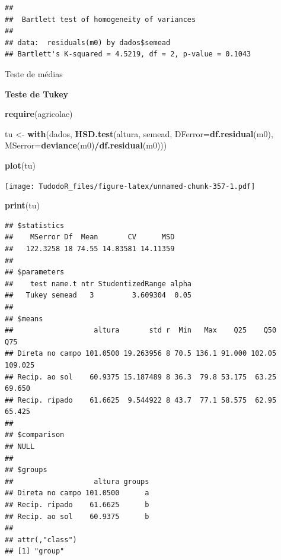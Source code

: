 \documentclass[
]{book}
\newenvironment{Shaded}{\begin{snugshade}}{\end{snugshade}}
\newcommand{\DataTypeTok}[1]{\textcolor[rgb]{0.13,0.29,0.53}{#1}}
\newcommand{\KeywordTok}[1]{\textcolor[rgb]{0.13,0.29,0.53}{\textbf{#1}}}
\newcommand{\NormalTok}[1]{#1}
\newcommand{\OperatorTok}[1]{\textcolor[rgb]{0.81,0.36,0.00}{\textbf{#1}}}
\newcommand{\StringTok}[1]{\textcolor[rgb]{0.31,0.60,0.02}{#1}}
\begin{document}
\begin{verbatim}
## 
##  Bartlett test of homogeneity of variances
## 
## data:  residuals(m0) by dados$semead
## Bartlett's K-squared = 4.5219, df = 2, p-value = 0.1043
\end{verbatim}

Teste de médias

\textbf{Teste de Tukey}

\begin{Shaded}
\begin{Highlighting}[]
\KeywordTok{require}\NormalTok{(agricolae)}
\end{Highlighting}
\end{Shaded}

\begin{Shaded}
\begin{Highlighting}[]
\NormalTok{tu <-}\StringTok{ }\KeywordTok{with}\NormalTok{(dados, }\KeywordTok{HSD.test}\NormalTok{(altura, semead,}
\DataTypeTok{DFerror=}\KeywordTok{df.residual}\NormalTok{(m0),}
\DataTypeTok{MSerror=}\KeywordTok{deviance}\NormalTok{(m0)}\OperatorTok{/}\KeywordTok{df.residual}\NormalTok{(m0)))}
\end{Highlighting}
\end{Shaded}

\begin{Shaded}
\begin{Highlighting}[]
\KeywordTok{plot}\NormalTok{(tu)}
\end{Highlighting}
\end{Shaded}

\texttt{[image: TudodoR\_files/figure-latex/unnamed-chunk-357-1.pdf]}

\begin{Shaded}
\begin{Highlighting}[]
\KeywordTok{print}\NormalTok{(tu)}
\end{Highlighting}
\end{Shaded}

\begin{verbatim}
## $statistics
##    MSerror Df  Mean       CV      MSD
##   122.3258 18 74.55 14.83581 14.11359
## 
## $parameters
##    test name.t ntr StudentizedRange alpha
##   Tukey semead   3         3.609304  0.05
## 
## $means
##                   altura       std r  Min   Max    Q25    Q50     Q75
## Direta no campo 101.0500 19.263956 8 70.5 136.1 91.000 102.05 109.025
## Recip. ao sol    60.9375 15.187489 8 36.3  79.8 53.175  63.25  69.650
## Recip. ripado    61.6625  9.544922 8 43.7  77.1 58.575  62.95  65.425
## 
## $comparison
## NULL
## 
## $groups
##                   altura groups
## Direta no campo 101.0500      a
## Recip. ripado    61.6625      b
## Recip. ao sol    60.9375      b
## 
## attr(,"class")
## [1] "group"
\end{verbatim}
\end{document}
